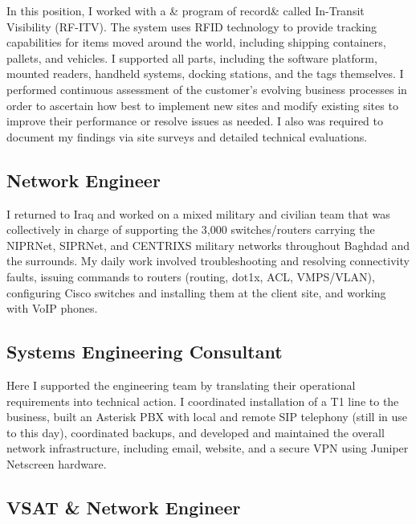 \documentclass{article}
\begin{document}
{\noindent}In this position, I worked with a & program of record&  called In-Transit Visibility (RF-ITV). The system uses RFID technology to provide tracking capabilities for items moved around the world, including shipping containers, pallets, and vehicles. I supported all parts, including the software platform, mounted readers, handheld systems, docking stations, and the tags themselves. I performed continuous assessment of the customer's evolving business processes in order to ascertain how best to implement new sites and modify existing sites to improve their performance or resolve issues as needed. I also was required to document my findings via site surveys and detailed technical evaluations.
\\\subsection { Network Engineer }

{\noindent}I returned to Iraq and worked on a mixed military and civilian team that was collectively in charge of supporting the 3,000 switches/routers carrying the NIPRNet, SIPRNet, and CENTRIXS military networks throughout Baghdad and the surrounds. My daily work involved troubleshooting and resolving connectivity faults, issuing commands to routers (routing, dot1x, ACL, VMPS/VLAN), configuring Cisco switches and installing them at the client site, and working with VoIP phones.
\\\subsection { Systems Engineering Consultant }

{\noindent}Here I supported the engineering team by translating their operational requirements into technical action. I coordinated installation of a T1 line to the business, built an Asterisk PBX with local and remote SIP telephony (still in use to this day), coordinated backups, and developed and maintained the overall network infrastructure, including email, website, and a secure VPN using Juniper Netscreen hardware.
\\\subsection { VSAT \& Network Engineer }
\end{document}
